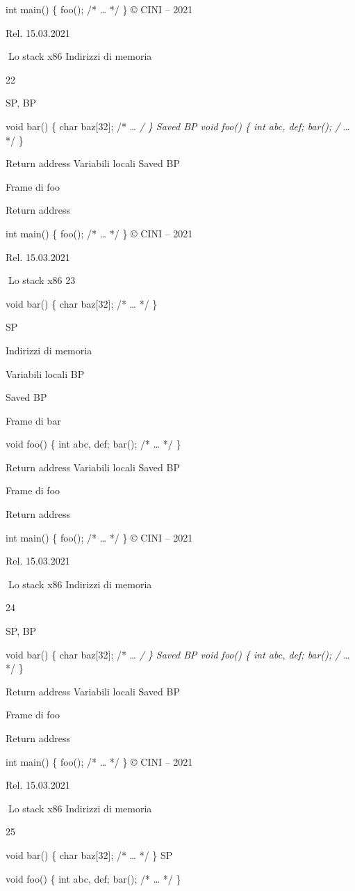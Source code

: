 \documentclass[11pt,a4paper]{article}
\begin{document}
int main() \{ foo(); /* \ldots{} */ \} © CINI -- 2021

Rel. 15.03.2021

Lo stack x86 Indirizzi di memoria

22

SP, BP

void bar() \{ char baz{[}32{]}; /* \ldots{} \emph{/ \} Saved BP void
foo() \{ int abc, def; bar(); /} \ldots{} */ \}

Return address Variabili locali Saved BP

Frame di foo

Return address

int main() \{ foo(); /* \ldots{} */ \} © CINI -- 2021

Rel. 15.03.2021

Lo stack x86 23

void bar() \{ char baz{[}32{]}; /* \ldots{} */ \}

SP

Indirizzi di memoria

Variabili locali BP

Saved BP

Frame di bar

void foo() \{ int abc, def; bar(); /* \ldots{} */ \}

Return address Variabili locali Saved BP

Frame di foo

Return address

int main() \{ foo(); /* \ldots{} */ \} © CINI -- 2021

Rel. 15.03.2021

Lo stack x86 Indirizzi di memoria

24

SP, BP

void bar() \{ char baz{[}32{]}; /* \ldots{} \emph{/ \} Saved BP void
foo() \{ int abc, def; bar(); /} \ldots{} */ \}

Return address Variabili locali Saved BP

Frame di foo

Return address

int main() \{ foo(); /* \ldots{} */ \} © CINI -- 2021

Rel. 15.03.2021

Lo stack x86 Indirizzi di memoria

25

void bar() \{ char baz{[}32{]}; /* \ldots{} */ \} SP

void foo() \{ int abc, def; bar(); /* \ldots{} */ \}
\end{document}
